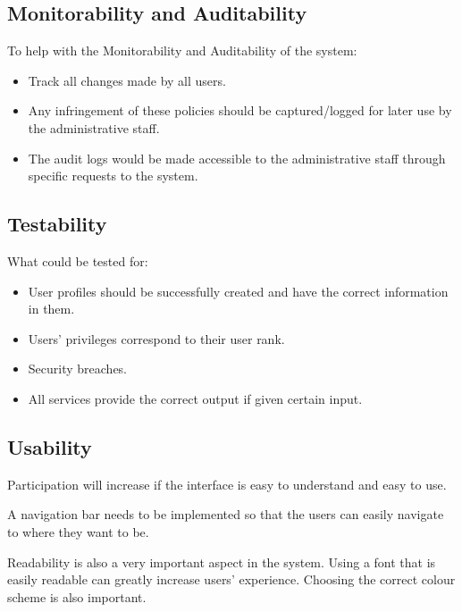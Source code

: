 
\subsection{Monitorability and Auditability}
To help with the Monitorability and Auditability of the system:
\begin{itemize}
\item Track all changes made by all users. 
\item Any infringement of these policies should be captured/logged for later use by the administrative staff.
\item The audit logs would be made accessible to the administrative staff through specific requests to the system. 
\end{itemize}

\subsection{Testability}
What could be tested for:
		\begin{itemize}
		\item User profiles should be successfully created and have the correct information in them.
		\item Users’ privileges correspond to their user rank.
		\item Security breaches.
		\item All services provide the correct output if given certain input.
		\end{itemize}


\subsection{Usability}
		Participation will increase if the interface is easy to understand and easy to use. 
		
		A navigation bar needs to be implemented so that the users can easily navigate to where they want to be. 
		
		Readability is also a very important aspect in the system. Using a font that is easily readable can greatly increase users’ experience. Choosing the correct colour scheme is also important. 
		
